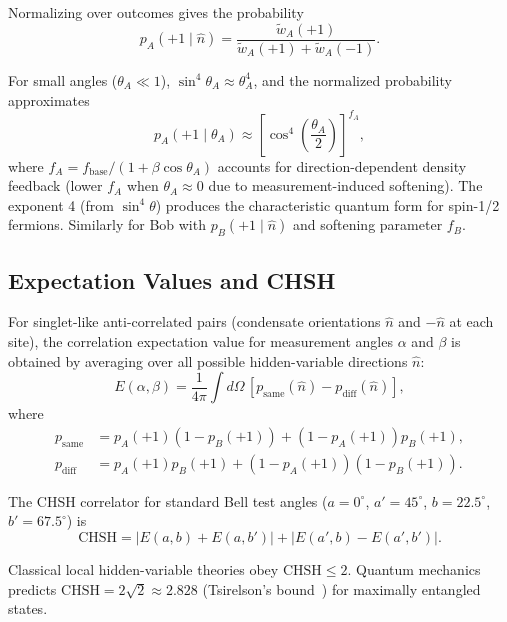 \documentclass[11pt,a4paper]{article}
\theoremstyle{definition}
\theoremstyle{remark}
\begin{document}
Normalizing over outcomes gives the probability
\begin{equation}
p_A(+1 \mid \hat{n}) = \frac{\tilde{w}_A(+1)}{\tilde{w}_A(+1) + \tilde{w}_A(-1)}.
\label{P8:eq:prob_plus}
\end{equation}

For small angles ($\theta_A \ll 1$), $\sin^4\theta_A \approx \theta_A^4$, and the normalized probability approximates
\begin{equation}
p_A(+1 \mid \theta_A) \approx \left[ \cos^4\left(\frac{\theta_A}{2}\right) \right]^{f_A},
\label{P8:eq:prob_smallangle}
\end{equation}
where $f_A = f_{\mathrm{base}} / (1 + \beta \cos\theta_A)$ accounts for direction-dependent density feedback (lower $f_A$ when $\theta_A \approx 0$ due to measurement-induced softening). The exponent 4 (from $\sin^4\theta$) produces the characteristic quantum form for spin-1/2 fermions. Similarly for Bob with $p_B(+1 \mid \hat{n})$ and softening parameter $f_B$.

\subsection{Expectation Values and CHSH}

For singlet-like anti-correlated pairs (condensate orientations $\hat{n}$ and $-\hat{n}$ at each site), the correlation expectation value for measurement angles $\alpha$ and $\beta$ is obtained by averaging over all possible hidden-variable directions $\hat{n}$:
\begin{equation}
E(\alpha, \beta) = \frac{1}{4\pi} \int d\Omega \, [p_{\mathrm{same}}(\hat{n}) - p_{\mathrm{diff}}(\hat{n})],
\label{P8:eq:E_expectation}
\end{equation}
where
\begin{align}
p_{\mathrm{same}} &= p_A(+1)(1 - p_B(+1)) + (1 - p_A(+1))p_B(+1), \\
p_{\mathrm{diff}} &= p_A(+1)p_B(+1) + (1 - p_A(+1))(1 - p_B(+1)).
\label{P8:eq:p_same_diff}
\end{align}

The CHSH correlator for standard Bell test angles ($a=0^\circ$, $a'=45^\circ$, $b=22.5^\circ$, $b'=67.5^\circ$) is
\begin{equation}
\mathrm{CHSH} = |E(a,b) + E(a,b')| + |E(a',b) - E(a',b')|.
\label{P8:eq:chsh_def}
\end{equation}

Classical local hidden-variable theories obey $\mathrm{CHSH} \leq 2$. Quantum mechanics predicts $\mathrm{CHSH} = 2\sqrt{2} \approx 2.828$ (Tsirelson's bound~\cite{Tsirelson1980}) for maximally entangled states.
\end{document}
